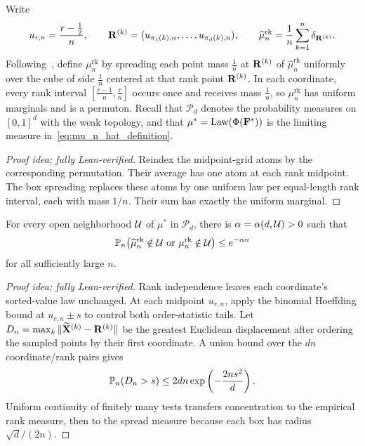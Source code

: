 \documentclass[11pt,letterpaper]{article}
\begin{document}
Write
\[
      u_{r,n}=\frac{r-\tfrac12}{n},\qquad \vR^{(k)}=(u_{\pi_1(k),n},\ldots,u_{\pi_d(k),n}),\qquad \widehat\mu_n^{\mathrm{rk}}=\frac1n\sum_{k=1}^n\delta_{\vR^{(k)}}.
\]
Following~\cite{BL}, define $\mu_n^{\mathrm{rk}}$ by spreading each point mass $\frac1n$ at $\vR^{(k)}$ of $\widehat\mu_n^{\mathrm{rk}}$ uniformly over the cube of side $\frac1n$ centered at that rank point $\vR^{(k)}$. In each coordinate, every rank interval $[\frac{r-1}{n},\frac{r}{n}]$ occurs once and receives mass $\frac1n$, so $\mu_n^{\mathrm{rk}}$ has uniform marginals and is a permuton. Recall that $\mathcal P_d$ denotes the probability measures on $[0,1]^d$ with the weak topology, and that $\mu^\ast=\law(\Phi(\vF^\ast))$ is the limiting measure in~\eqref{eq:mu_n_hat_definition}.

\begin{proof}[Proof idea; fully Lean-verified]
Reindex the midpoint-grid atoms by the corresponding permutation. Their average has one atom at each rank midpoint. The box spreading replaces these atoms by one uniform law per equal-length rank interval, each with mass $1/n$. Their sum has exactly the uniform marginal.
\end{proof}


      \begin{theorem}\label{thm:permuton}\label{prop:permuton}\label{cor:permuton}
            For every open neighborhood $\cU$ of $\mu^\ast$ in $\mathcal P_d$, there is $\alpha=\alpha(d,\cU)>0$ such that
            \[
                  \P_n\bigl(\widehat\mu_n^{\mathrm{rk}}\notin\cU \text{ or }\mu_n^{\mathrm{rk}}\notin\cU\bigr) \le e^{-\alpha n}
            \]
            for all sufficiently large $n$.
      \end{theorem}

\begin{proof}[Proof idea; fully Lean-verified]
Rank independence leaves each coordinate's sorted-value law unchanged. At each midpoint \(u_{r,n}\), apply the binomial Hoeffding bound at \(u_{r,n}\pm s\) to control both order-statistic tails. Let \(D_n=\max_k\|\widetilde{\vX}^{(k)}-\vR^{(k)}\|\) be the greatest Euclidean displacement after ordering the sampled points by their first coordinate. A union bound over the \(dn\) coordinate/rank pairs gives
\begin{equation}\label{eq:rank-displacement}
  \P_n(D_n>s)\le2dn\exp\left(-\frac{2ns^2}{d}\right).
\end{equation}
Uniform continuity of finitely many tests transfers concentration to the empirical rank measure, then to the spread measure because each box has radius \(\sqrt d/(2n)\).
\end{proof}
\end{document}
